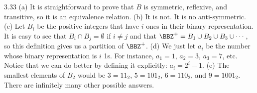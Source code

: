 \begin{RequAnswer}{3.33}
(a) It is straightforward to prove that $B$ is symmetric, reflexive, and transitive, so it is an equivalence relation.
(b) It is not. It is no anti-symmetric.
(c) Let $B_i$ be the positive integers that have $i$ ones in their binary representation.
It is easy to see that $B_i\cap B_j=\emptyset$ if $i\not = j$ and that  $\BBZ^+ = B_1\cup B_2\cup B_3\cup\cdots$,
so this definition gives us a partition of $\BBZ^+$.
(d) We just let $a_i$ be the number whose binary representation is $i$ 1s.
For instance, $a_1=1$, $a_2=3$, $a_3=7$, etc. Notice that we can do better by defining it explicitly: $a_i=2^i-1$.
(e) The smallest elements of $B_2$ would be $3=11_2$, $5=101_2$, $6=110_2$, and $9=1001_2$.
There are infinitely many other possible answers.
\end{RequAnswer}
